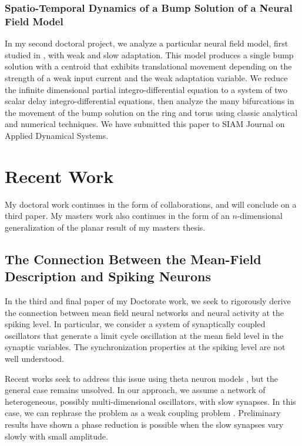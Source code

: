 \documentclass[a4paper,11pt]{article}
\begin{document}
\subsubsection{Spatio-Temporal Dynamics of a Bump Solution of a Neural Field Model}
In my second doctoral project, we analyze a particular neural field model, first studied in \cite{pinto_ermentrout_2001_siam}, with weak and slow adaptation. This model produces a single bump solution with a centroid that exhibits translational movement depending on the strength of a weak input current and the weak adaptation variable. We reduce the infinite dimensional partial integro-differential equation to a system of two scalar delay integro-differential equations, then analyze the many bifurcations in the movement of the bump solution on the ring and torus using classic analytical and numerical techniques. We have submitted this paper to SIAM Journal on Applied Dynamical Systems.

\section{Recent Work}
My doctoral work continues in the form of collaborations, and will conclude on a third paper. My masters work also continues in the form of an $n$-dimensional generalization of the planar result of my masters thesis.

\subsection{The Connection Between the Mean-Field Description and Spiking Neurons}
In the third and final paper of my Doctorate work, we seek to rigorously derive the connection between mean field neural networks and neural activity at the spiking level. In particular, we consider a system of synaptically coupled oscillators that generate a limit cycle oscillation at the mean field level in the synaptic variables. The synchronization properties at the spiking level are not well understood.

Recent works seek to address this issue using theta neuron models \cite{laing2014derivation}, but the general case remains unsolved. In our approach, we assume a network of heterogeneous, possibly multi-dimensional oscillators, with slow synapses. In this case, we can rephrase the problem as a weak coupling problem \cite{rubinrubin}. Preliminary results have shown a phase reduction is possible when the slow synapses vary slowly with small amplitude.
\end{document}
